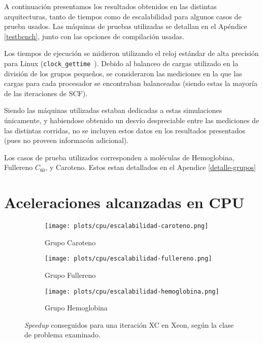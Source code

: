 A continuaci\'on presentamos los resultados obtenidos en las distintas arquitecturas, tanto
de tiempos como de escalabilidad para algunos casos de prueba usados. Las m\'aquinas de pruebas
utilizadas se detallan en el Ap\'endice \ref{testbench}, junto con las opciones de compilaci\'on usadas.

Los tiempos de ejecuci\'on se midieron utilizando el reloj est\'andar de alta
precisi\'on para Linux (\texttt{clock\_gettime}~\cite{LinuxDocumentation}). Debido al
balanceo de cargas utilizado en la divisi\'on de los grupos peque\~nos, se consideraron
las mediciones en la que las cargas para cada procesador se encontraban balanceadas
(siendo estas la mayor\'ia de las iteraciones de SCF).

Siendo las m\'aquinas utilizadas estaban dedicadas a estas simulaciones \'unicamente,
y habiendose obtenido un desv\'io despreciable entre las mediciones de las distintas
corridas, no se incluyen estos datos en los resultados presentados (pues no proveen
informac\'on adicional).

Los casos de prueba utilizados corresponden a mol\'eculas de Hemoglobina, Fullereno $C_{60}$,
y Caroteno. Estos estan detallados en el Apendice \ref{detalle-grupos}

\section{Aceleraciones alcanzadas en CPU}

\begin{figure}[htbp]
\centering
\begin{subfigure}[b]{\plotwidthtres}
   \texttt{[image: plots/cpu/escalabilidad-caroteno.png]}
   \caption{Grupo Caroteno}
   \label{fig:cpu-scalability-caroteno}
 \end{subfigure}
\begin{subfigure}[b]{\plotwidthtres}
   \texttt{[image: plots/cpu/escalabilidad-fullereno.png]}
   \caption{Grupo Fullereno}
   \label{fig:cpu-scalability-fullereno}
 \end{subfigure}
\begin{subfigure}[b]{\plotwidthtres}
   \texttt{[image: plots/cpu/escalabilidad-hemoglobina.png]}
   \caption{Grupo Hemoglobina}
   \label{fig:cpu-scalability-hemo}
 \end{subfigure}
 \caption{\textit{Speedup} conseguidos para una iteraci\'on XC en Xeon, seg\'un
 la clase de problema examinado.}
 \label{fig:cpu-scalability}
\end{figure}

